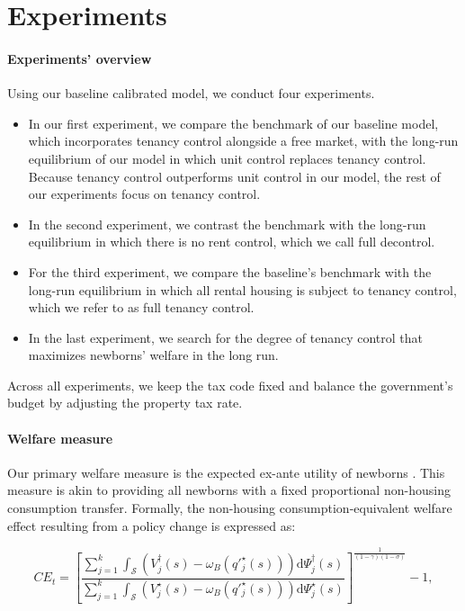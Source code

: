 \documentclass[parskip=full]{article}
\begin{document}
\section{Experiments}\label{section:experiments}

\paragraph{Experiments' overview} Using our baseline calibrated model, we conduct four experiments.

\begin{itemize}
    \item In our first experiment, we compare the benchmark of our baseline model, which incorporates tenancy control alongside a free market, with the long-run equilibrium of our model in which unit control replaces tenancy control. Because tenancy control outperforms unit control in our model, the rest of our experiments focus on tenancy control.
    \item In the second experiment, we contrast the benchmark with the long-run equilibrium in which there is no rent control, which we call full decontrol.
    \item For the third experiment, we compare the baseline's benchmark with the long-run equilibrium in which all rental housing is subject to tenancy control, which we refer to as full tenancy control.
    \item In the last experiment, we search for the degree of tenancy control that maximizes newborns' welfare in the long run.
\end{itemize}

Across all experiments, we keep the tax code fixed and balance the government's budget by adjusting the property tax rate.

\paragraph{Welfare measure} Our primary welfare measure is the expected ex-ante utility of newborns \citep{ralws-1971,conesa-et-al,gkkoc}. This measure is akin to providing all newborns with a fixed proportional non-housing consumption transfer. Formally, the non-housing consumption-equivalent welfare effect resulting from a policy change is expressed as:

\begin{equation}
  CE_{t} = \left[\frac{\sum_{j=1}^{k}\int_{\mathcal{S}}\left(V^{\dagger}_{j}(s)-\omega_{B}\left(q'^{\star}_{j}(s)\right)\right)\mathrm{d}\Psi^{\dagger}_{j}(s)}{\sum_{j=1}^{k}\int_{\mathcal{S}}\left(V^{\star}_{j}(s)-\omega_{B}\left(q'^{\star}_{j}(s)\right)\right)\mathrm{d}\Psi^{\star}_{j}(s)}\right]^{\frac{1}{(1-\gamma)(1-\sigma)}}-1,
\end{equation}
\end{document}
